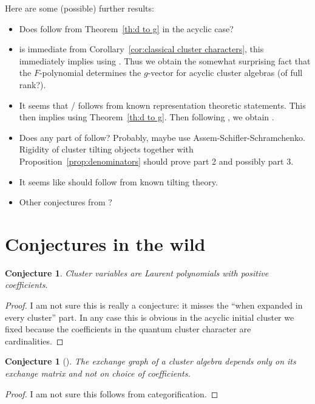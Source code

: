 \documentclass{amsart}
\newtheorem{conjecture}[theorem]{Conjecture}
\begin{document}
  Here are some (possible) further results:
  \begin{itemize}
    \item Does \cite[Conj. 6.13]{fomin-zelevinsky4} follow from Theorem~\ref{th:d to g} in the acyclic case?
    \item \cite[Conj. 7.17]{fomin-zelevinsky4} is immediate from Corollary~\ref{cor:classical cluster characters}, this immediately implies \cite[Conj. 6.11]{fomin-zelevinsky4} using \cite[Prop. 7.16]{fomin-zelevinsky4}.  
      Thus we obtain the somewhat surprising fact that the $F$-polynomial determines the $g$-vector for acyclic cluster algebras (of full rank?).
    \item It seems that \cite[Con. 7.6]{fomin-zelevinsky4}/\cite[Conj. 3.22]{reading-speyer} follows from known representation theoretic statements.
      This then implies \cite[Conj. 7.10]{fomin-zelevinsky4} using Theorem~\ref{th:d to g}.
      Then following \cite[Rem. 7.11]{fomin-zelevinsky4}, we obtain \cite[Con. 7.2]{fomin-zelevinsky4}.
    \item Does any part of \cite[Conj. 7.4]{fomin-zelevinsky4} follow?  
      Probably, maybe use Assem-Schifler-Schramchenko.
      Rigidity of cluster tilting objects together with Proposition~\ref{prop:denominators} should prove part 2 and possibly part 3.
    \item It seems like \cite[Conj. 3.9]{reading-speyer} should follow from known tilting theory.
    \item Other conjectures from \cite{reading-speyer}?
  \end{itemize}

\section{Conjectures in the wild}

\begin{conjecture}
  Cluster variables are Laurent polynomials with positive coefficients.
\end{conjecture}
\begin{proof}
  I am not sure this is really a conjecture: it misses the ``when expanded in every cluster'' part.
  In any case this is obvious in the acyclic initial cluster we fixed because the coefficients in the quantum cluster character are cardinalities.
\end{proof}

\begin{conjecture}[{\cite[Conjecture 4.14(1)]{FZ03}}]
  The exchange graph of a cluster algebra depends only on its exchange matrix and not on choice of coefficients.
\end{conjecture}
\begin{proof}
  I am not sure this follows from categorification.
\end{proof}
\end{document}
